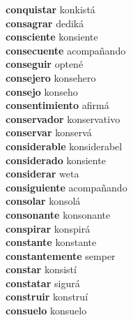 \textbf{conquistar } konkistá \\
\textbf{consagrar } dediká \\
\textbf{consciente } konsiente \\
\textbf{consecuente } acompañando \\
\textbf{conseguir } optené \\
\textbf{consejero } konsehero \\
\textbf{consejo } konseho \\
\textbf{consentimiento } afirmá \\
\textbf{conservador } konservativo \\
\textbf{conservar } konservá \\
\textbf{considerable } konsiderabel \\
\textbf{considerado } konsiente \\
\textbf{considerar } weta \\
\textbf{consiguiente } acompañando \\
\textbf{consolar } konsolá \\
\textbf{consonante } konsonante \\
\textbf{conspirar } konspirá \\
\textbf{constante } konstante \\
\textbf{constantemente } semper \\
\textbf{constar } konsistí \\
\textbf{constatar } sigurá \\
\textbf{construir } konstruí \\
\textbf{consuelo } konsuelo \\
